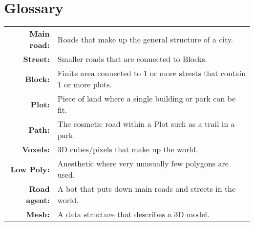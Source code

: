 \section*{Glossary}

\begin{table}[h!]
    \centering
    \begin{tabular}{rl}
        \textbf{Main road:}  & Roads that make up the general structure of a city.                       \\
        \textbf{Street:}     & Smaller roads that are connected to Blocks.                               \\
        \textbf{Block:}      & Finite area connected to 1 or more streets that contain 1 or more plots.  \\
        \textbf{Plot:}       & Piece of land where a single building or park can be fit.                 \\
        \textbf{Path:}       & The cosmetic road within a Plot such as a trail in a park.                \\
        \textbf{Voxels:}     & 3D cubes/pixels that make up the world.                                   \\
        \textbf{Low Poly:}   & Anesthetic where very unusually few polygons are used.                    \\
        \textbf{Road agent:} & A bot that puts down main roads and streets in the world.                 \\
        \textbf{Mesh:}       & A data structure that describes a 3D model.                                
    \end{tabular}
\end{table}